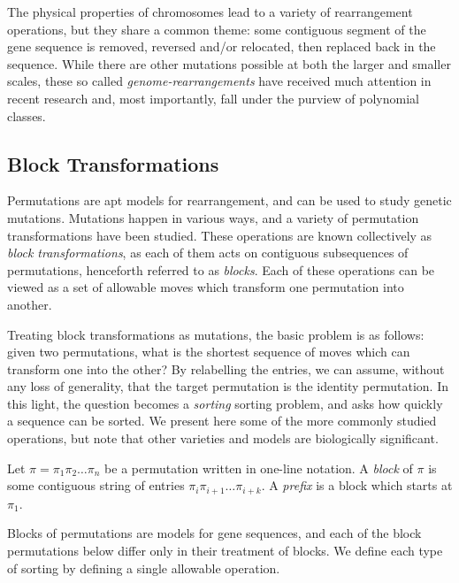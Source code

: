 \documentclass[12pt,twoside]{memoir}
\begin{document}
      The physical properties of chromosomes lead to a variety of rearrangement
      operations, but they share a common theme: some contiguous segment of the
      gene sequence is removed, reversed and/or relocated, then replaced back in
      the sequence. While there are other mutations possible at both the larger
      and smaller scales, these so called \emph{genome-rearrangements} have
      received much attention in recent research and, most importantly, fall
      under the purview of polynomial classes.



    \subsection{Block Transformations}
    
      Permutations are apt models for rearrangement, and can be used to study
      genetic mutations. Mutations happen in various ways, and a variety of
      permutation transformations have been studied. These operations are known
      collectively as \emph{block transformations}, as each of them acts on
      contiguous subsequences of permutations, henceforth referred to as
      \emph{blocks}. Each of these operations can be viewed as a set of allowable
      moves which transform one permutation into another. 
      
      Treating block transformations as mutations, the basic problem is as
      follows: given two permutations, what is the shortest sequence of moves
      which can transform one into the other? By relabelling the entries, we can
      assume, without any loss of generality, that the target permutation is the
      identity permutation. In this light, the question becomes a \emph{sorting}
      sorting problem, and asks how quickly a sequence can be sorted.  We present
      here some of the more commonly studied operations, but note that other
      varieties and models are biologically significant.  

      \begin{definition} \label{polyclass:def:block}
        Let $\pi = \pi_1 \pi_2 \dots \pi_n$ be a permutation written in one-line
        notation. A \emph{block} of $\pi$ is some contiguous string of entries 
        $\pi_{i} \pi_{i + 1} \dots \pi_{i+k}$. 
        A \emph{prefix} is a block which starts at $\pi_1$. 
      \end{definition}

      Blocks of permutations are models for gene sequences, and each of the block
      permutations below differ only in their treatment of blocks. We define each
      type of sorting by defining a single allowable operation. 
\end{document}
